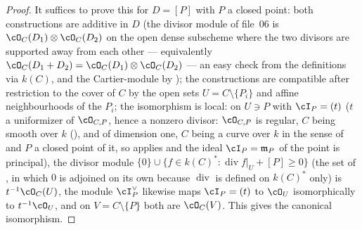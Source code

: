 \begin{proof}
It suffices to prove this for $D=[P]$ with $P$ a closed point: both
constructions are additive in $D$ (the divisor module of file~06 is
$\cO_C(D_1)\otimes\cO_C(D_2)$ on the open dense subscheme where the two
divisors are supported away from each other — equivalently
$\cO_C(D_1+D_2)=\cO_C(D_1)\otimes\cO_C(D_2)$ — an easy check from the
definitions via $k(C)$, and the Cartier-module by
); the constructions are
compatible after restriction to the cover of $C$ by the open sets
$U=C\setminus\{P_i\}$ and affine neighbourhoods of the $P_i$; the
isomorphism is local: on $U\ni P$ with $\cI_P=(t)$ ($t$ a uniformizer
of $\cO_{C,P}$, hence a nonzero divisor: $\cO_{C,P}$ is regular, $C$
being smooth over $k$ (), and of
dimension one, $C$ being a curve over $k$ in the sense of
 and $P$ a closed point of it, so
 applies and the ideal $\cI_P=\mathfrak
m_P$ of the point is principal), the divisor module
$\{0\}\cup\{f\in k(C)^*:\operatorname{div}f|_U+[P]\ge0\}$ (the set of
, in which $0$ is adjoined on its own because
$\operatorname{div}$ is defined on $k(C)^*$ only) is
$t^{-1}\cO_C(U)$, the module $\cI_P^\vee$ likewise maps
$\cI_P=(t)$ to $\cO_U$ isomorphically to $t^{-1}\cO_U$, and on
$V=C\setminus\{P\}$ both are $\cO_C(V)$.  This gives the canonical
isomorphism.


\end{proof}

